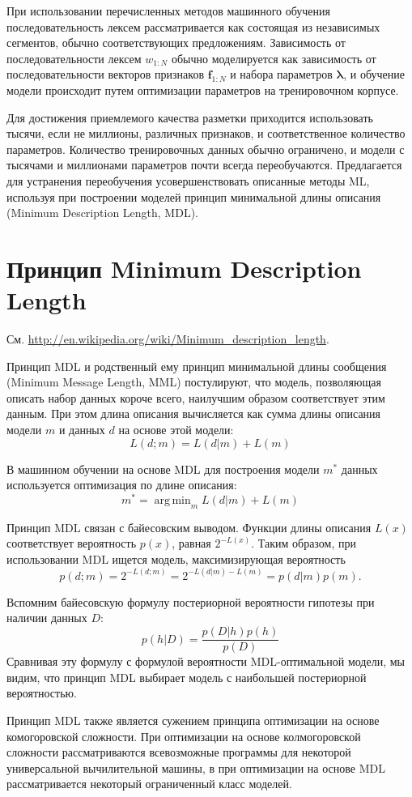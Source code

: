 \documentclass[12pt,a4paper]{article}
\DeclareMathOperator*{\argmin}{arg\,min}
\begin{document}
При использовании перечисленных методов машинного обучения
последовательность лексем рассматривается как состоящая из независимых
сегментов, обычно соответствующих предложениям. Зависимость от
последовательности лексем $w_{1:N}$ обычно моделируется как зависимость
от последовательности векторов признаков $\mathbf{f}_{1:N}$ и набора
параметров $\boldsymbol\lambda$, и обучение модели происходит путем
оптимизации параметров на тренировочном корпусе.

Для достижения приемлемого качества разметки приходится использовать
тысячи, если не миллионы, различных признаков, и соответственное
количество параметров. Количество тренировочных данных обычно
ограничено, и модели с тысячами и миллионами параметров почти всегда
переобучаются. Предлагается для устранения переобучения
усовершенствовать описанные методы ML, используя при построении моделей
принцип минимальной длины описания (Minimum Description Length, MDL).

\section{Принцип Minimum Description Length}

См. \url{http://en.wikipedia.org/wiki/Minimum\_description\_length}.

Принцип MDL \cite{rissanen1983} и родственный ему принцип минимальной
длины сообщения (Minimum Message Length, MML) постулируют, что модель,
позволяющая описать набор данных короче всего, наилучшим образом
соответствует этим данным. При этом длина описания вычисляется как сумма
длины описания модели $m$ и данных $d$ на основе этой модели:
\[
L(d;m) = L(d|m) + L(m)
\]

В машинном обучении на основе MDL для построения модели $m^*$ данных
используется оптимизация по длине описания:
\[
m^* = \argmin_{m} L(d|m) + L(m)
\]

Принцип MDL связан с байесовским выводом. Функции длины описания $L(x)$
соответствует вероятность $p(x)$, равная $2^{-L(x)}$. Таким образом,
при использовании MDL ищется модель, максимизирующая вероятность
\[
p(d;m) = 2^{-L(d;m)} = 2^{-L(d|m)-L(m)} = p(d|m) p(m).
\]

Вспомним байесовскую формулу постериорной вероятности гипотезы при
наличии данных $D$:
\[
p(h|D) = \frac{p(D|h) p(h)}{p(D)}
\]
Сравнивая эту формулу с формулой вероятности MDL-оптимальной модели, мы
видим, что принцип MDL выбирает модель с наибольшей постериорной
вероятностью.

Принцип MDL также является сужением принципа оптимизации на основе
комогоровской сложности. При оптимизации на основе колмогоровской
сложности рассматриваются всевозможные программы для некоторой
универсальной вычилительной машины, в при оптимизации на основе MDL
рассматривается некоторый ограниченный класс моделей.
\end{document}
